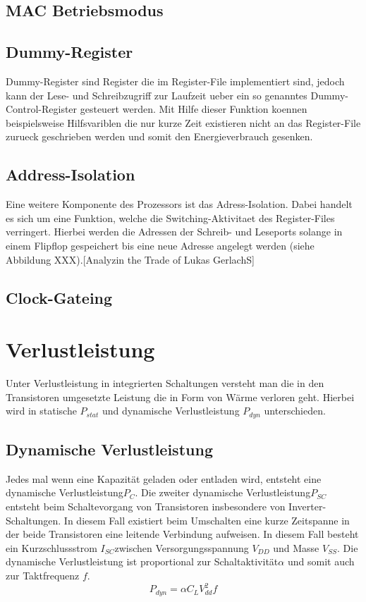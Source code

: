 \subsection{MAC Betriebsmodus}\label{subsec:macMode}

\subsection{Dummy-Register}\label{subsec:dummy}
Dummy-Register sind Register die im Register-File implementiert sind, jedoch kann der Lese- und Schreibzugriff zur Laufzeit ueber ein so genanntes Dummy-Control-Register gesteuert werden. Mit Hilfe dieser Funktion koennen beispielsweise Hilfsvariblen die nur kurze Zeit existieren nicht an das Register-File zurueck geschrieben werden und somit den Energieverbrauch gesenken. 

\subsection{Address-Isolation}\label{subsec:add_iso}
Eine weitere Komponente des Prozessors ist das Adress-Isolation. Dabei handelt es sich um eine Funktion, welche die Switching-Aktivitaet des Register-Files verringert. Hierbei werden die Adressen der Schreib- und Leseports solange in einem Flipflop gespeichert bis eine neue Adresse angelegt werden (siehe Abbildung XXX).[Analyzin the Trade of Lukas GerlachS]

\subsection{Clock-Gateing}\label{subsec:clock-gate}

\section{Verlustleistung}
\label{sec:verlustleistung}
Unter Verlustleistung in integrierten Schaltungen versteht man die in den Transistoren umgesetzte Leistung die in Form von Wärme verloren geht.
Hierbei wird in statische \(P_{stat}\) und dynamische Verlustleistung \(P_{dyn}\) unterschieden. 
\subsection{Dynamische Verlustleistung}\label{subsec:dynVerl}
Jedes mal wenn eine Kapazität geladen oder entladen wird, entsteht eine dynamische Verlustleistung\(P_C\). Die zweiter dynamische Verlustleistung\(P_{SC}\) entsteht beim Schaltevorgang von Transistoren insbesondere von Inverter-Schaltungen. In diesem Fall existiert beim Umschalten eine kurze Zeitspanne in der beide Transistoren eine leitende Verbindung aufweisen. In diesem Fall besteht ein Kurzschlussstrom \(I_{SC}\)zwischen Versorgungsspannung \(V_{DD}\) und Masse \(V_{SS}\). Die dynamische Verlustleistung ist proportional zur Schaltaktivität\(\alpha\) und somit auch zur Taktfrequenz $f$.
\begin{equation}
P_{dyn} = \alpha  C_L  V_{dd}^{2}  f
\label{eq:dynVerlustleistung}
\end{equation}
